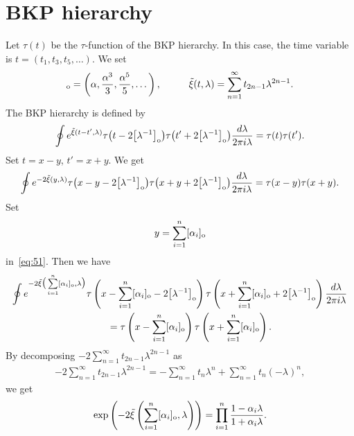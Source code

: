 \documentclass[11pt]{article}
\begin{document}
\section{BKP hierarchy}\label{section4}

Let $\tau(t)$ be the $\tau$-function of the BKP hierarchy.
In this case, the time variable is $t=(t_1,t_3,t_5,\dots)$.
We set
\begin{gather*}
[\alpha]_{\rm o}=\left(\alpha,\frac{\alpha^3}{3},\frac{\alpha^5}{5},\dots\right),\hskip1cm\tilde{\xi}
(t,\lambda)=\sum_{n=1}^{\infty}t_{2n-1}\lambda^{2n-1}.
\end{gather*}
The BKP hierarchy \cite{DJKM1,JM1} is def\/ined by
\begin{gather}
\oint e^{\tilde{\xi}(t-t',\lambda)}\tau\big(t-2\big[\lambda^{-1}\big]_{\rm o}\big)\tau\big(t'+2\big[\lambda^{-1}\big]_{\rm o}\big)\frac{d\lambda}
{2\pi i\lambda}=\tau(t)\tau(t').
\label{eq:50}
\end{gather}
Set $t=x-y$, $t'=x+y$.
We get
\begin{gather}
\oint e^{-2\tilde{\xi}(y,\lambda)}\tau\big(x-y-2\big[\lambda^{-1}\big]_{\rm o}\big)\tau\big(x+y+2\big[\lambda^{-1}\big]_{\rm o}\big)\frac{d\lambda}
{2\pi i\lambda}=\tau(x-y)\tau(x+y).
\label{eq:51}
\end{gather}
Set
\begin{gather*}
y=\sum_{i=1}^{n} [\alpha_i]_{\rm o}
\end{gather*}
in~\eqref{eq:51}. Then we have
\begin{gather*}%
\oint e^{-2\tilde{\xi}\big(\sum\limits_{i=1}^{n} [\alpha_i]_{\rm o},\lambda\big)}\tau\left(x-\sum_{i=1}^{n}
 [\alpha_i]_{\rm o}-2\big[\lambda^{-1}\big]_{\rm o}\right)
\tau\left(x+\sum_{i=1}^{n} [\alpha_i]_{\rm o}+2\big[\lambda^{-1}\big]_{\rm o}\right)\frac{d\lambda}{2\pi i\lambda}
\\
\qquad
{}=\tau\left(x-\sum_{i=1}^{n} [\alpha_i]_{\rm o}\right)\tau\left(x+\sum_{i=1}^{n} [\alpha_i]_{\rm o}\right).
\end{gather*}
By decomposing $-2\sum\limits_{n=1}^\infty t_{2n-1}{\lambda}^{2n-1}$ as
\begin{gather*}
-2\sum_{n=1}^\infty t_{2n-1}{\lambda}^{2n-1}=-\sum_{n=1}^{\infty}t_n{\lambda}^n+\sum_{n=1}^{\infty}
t_n(-\lambda)^n,
\end{gather*}
we get
\begin{gather*}
\exp\left(-2\tilde{\xi}\left(\sum_{i=1}^{n} [\alpha_i]_{\rm o},\lambda\right)\right)=\prod_{i=1}^{n}
\frac{1-\alpha_i\lambda}{1+\alpha_i\lambda}.
\end{gather*}
\end{document}
